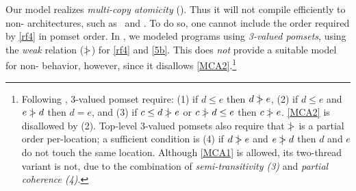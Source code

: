 
Our model realizes \emph{multi-copy atomicity} (\mca).  Thus it will not
compile efficiently to non-\mca{} architectures, such as \ppc\ and \armseven.
To do so, one cannot include the order required by \ref{rf4} in pomset order.
In \cite{2019-sp}, we modeled programs using \emph{3-valued pomsets}, using
the \emph{weak} relation ($\mathrel{\,\mid\!\!\!>}$) for \ref{rf4} and \ref{5b}.  This does
\emph{not} provide a suitable model for non-\mca{} behavior, however, since
it disallows \ref{MCA2}.\footnote{Following \cite{DBLP:journals/dc/Lamport86},
  3-valued pomset require: (1) if $d\leq e$ then $d\mathrel{\,\mid\!\!\!>} e$, (2) if
  $d\leq e$ and $e\mathrel{\,\mid\!\!\!>} d$ then $d=e$, and (3) if $c\leq d \mathrel{\,\mid\!\!\!>} e$ or
  $c\mathrel{\,\mid\!\!\!>} d\leq e$ then $c\mathrel{\,\mid\!\!\!>} e$.  \ref{MCA2} is disallowed by (2).
  Top-level 3-valued pomsets also require that $\mathrel{\,\mid\!\!\!>}$ is a partial order
  per-location; a sufficient condition is (4) if $d\mathrel{\,\mid\!\!\!>} e$ and $e\mathrel{\,\mid\!\!\!>} d$
  then $d$ and $e$ do not touch the same location.  Although \ref{MCA1} is
  allowed, its two-thread variant is not, due to the combination of
  \emph{semi\hyp{}transitivity (3)} and \emph{partial coherence (4)}.}



